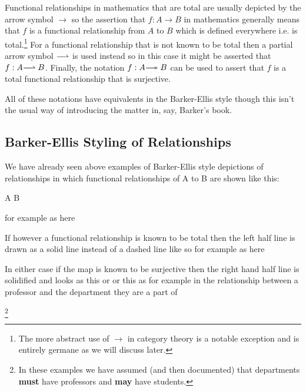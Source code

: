 \mynote Functional relationships in mathematics that are total are usually depicted by the arrow symbol $\longrightarrow$ so the assertion that $f:A \longrightarrow B$ in mathematics generally means that $f$ is a functional relationship from $A$ to $B$ which is defined everywhere i.e. is total.\footnote{The more abstract use of $\longrightarrow$ in category theory is a notable exception and is entirely germane as we will discuss later.} 
For a functional relationship that is not known to be total 
then a partial arrow symbol $-\kern-5pt\rightharpoonup$ is used instead so in this case it might be asserted that $f:A -\kern-5pt\rightharpoonup B$.
Finally, the notation $f: A -\kern-5pt\twoheadrightarrow B$ can be used to assert that $f$ is a total functional relationship that is surjective.  

\noindent All of these notations have equivalents in the Barker-Ellis style though this isn't the usual way of introducing the matter in, say, Barker's book.

\subsection*{Barker-Ellis Styling of Relationships}
\mynote We have already seen above examples of Barker-Ellis style depictions of relationships in which functional relationships of A to B
are shown like this:
\begin{center}
A\,\barkerEllisA\,B
\end{center}
\noindent for example as here
\begin{center}

\end{center}
If however a functional relationship is known to be total then the left half line is drawn as a solid line instead of a dashed line like so \barkerEllisC
for example as here 
\begin{center}

\end{center}
In either case if the map is known to be surjective then the right hand half line is solidified and looks as this \barkerEllisB or \barkerEllisD
or this
as for example in the relationship between a professor and the department they are a part of 
\begin{center}

\end{center}
\footnote{In these examples we have assumed (and then documented) that departments \textbf{must} have professors and \textbf{may} have students.}

